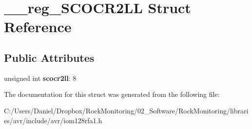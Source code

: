 \hypertarget{struct____reg___s_c_o_c_r2_l_l}{}\section{\+\_\+\+\_\+reg\+\_\+\+S\+C\+O\+C\+R2\+LL Struct Reference}
\label{struct____reg___s_c_o_c_r2_l_l}
\subsection*{Public Attributes}
\begin{DoxyCompactItemize}
\item 
unsigned int {\bfseries scocr2ll}\+: 8\hypertarget{struct____reg___s_c_o_c_r2_l_l_a4c02f85449f9aa7ab515caa212ec5969}{}\label{struct____reg___s_c_o_c_r2_l_l_a4c02f85449f9aa7ab515caa212ec5969}

\end{DoxyCompactItemize}


The documentation for this struct was generated from the following file\+:\begin{DoxyCompactItemize}
\item 
C\+:/\+Users/\+Daniel/\+Dropbox/\+Rock\+Monitoring/02\+\_\+\+Software/\+Rock\+Monitoring/libraries/avr/include/avr/iom128rfa1.\+h\end{DoxyCompactItemize}
